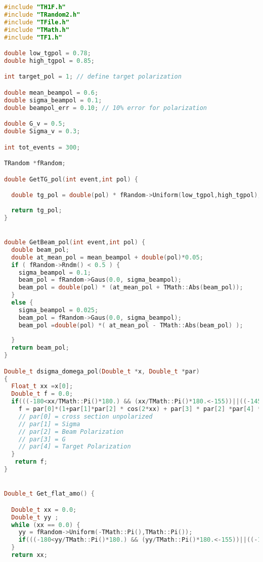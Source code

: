 \begin{lstlisting}[language=C++]
#include "TH1F.h"
#include "TRandom2.h"
#include "TFile.h"
#include "TMath.h"
#include "TF1.h"

double low_tgpol = 0.78;
double high_tgpol = 0.85;

int target_pol = 1; // define target polarization

double mean_beampol = 0.6;
double sigma_beampol = 0.1;
double beampol_err = 0.10; // 10% error for polarization

double G_v = 0.5;
double Sigma_v = 0.3;

int tot_events = 300;

TRandom *fRandom;

double GetTG_pol(int event,int pol) {

  double tg_pol = double(pol) * fRandom->Uniform(low_tgpol,high_tgpol);
  
  return tg_pol;
}


double GetBeam_pol(int event,int pol) {
  double beam_pol;
  double at_mean_pol = mean_beampol + double(pol)*0.05;
  if ( fRandom->Rndm() < 0.5 ) {
    sigma_beampol = 0.1;
    beam_pol = fRandom->Gaus(0.0, sigma_beampol);
    beam_pol = double(pol) * (at_mean_pol + TMath::Abs(beam_pol));
  }
  else {
    sigma_beampol = 0.025;
    beam_pol = fRandom->Gaus(0.0, sigma_beampol);
    beam_pol =double(pol) *( at_mean_pol - TMath::Abs(beam_pol) );
 
  }
  return beam_pol;
}

Double_t dsigma_domega_pol(Double_t *x, Double_t *par)
{
  Float_t xx =x[0];
  Double_t f = 0.0;
  if(((-180<xx/TMath::Pi()*180.) && (xx/TMath::Pi()*180.<-155))||((-145<xx/TMath::Pi()*180.)&&(xx/TMath::Pi()*180.<-95))||((-85<xx/TMath::Pi()*180.)&&(xx/TMath::Pi()*180.<-35))||((-25<xx/TMath::Pi()*180.)&&(xx/TMath::Pi()*180.<25))||((35<xx/TMath::Pi()*180.)&&(xx/TMath::Pi()*180.<85))||((95<xx/TMath::Pi()*180.)&&(xx/TMath::Pi()*180.<145))||((155<xx/TMath::Pi()*180.)&&(xx/TMath::Pi()*180.<180))){
    f = par[0]*(1+par[1]*par[2] * cos(2*xx) + par[3] * par[2] *par[4] * sin(2*xx));  
    // par[0] = cross section unpolarized
    // par[1] = Sigma
    // par[2] = Beam Polarization
    // par[3] = G
    // par[4] = Target Polarization
  }
   return f;
}


Double_t Get_flat_amo() {

  Double_t xx = 0.0;
  Double_t yy ;
  while (xx == 0.0) {
    yy = fRandom->Uniform(-TMath::Pi(),TMath::Pi());
    if(((-180<yy/TMath::Pi()*180.) && (yy/TMath::Pi()*180.<-155))||((-145<yy/TMath::Pi()*180.)&&(yy/TMath::Pi()*180.<-95))||((-85<yy/TMath::Pi()*180.)&&(yy/TMath::Pi()*180.<-35))||((-25<yy/TMath::Pi()*180.)&&(yy/TMath::Pi()*180.<25))||((35<yy/TMath::Pi()*180.)&&(yy/TMath::Pi()*180.<85))||((95<yy/TMath::Pi()*180.)&&(yy/TMath::Pi()*180.<145))||((155<yy/TMath::Pi()*180.)&&(yy/TMath::Pi()*180.<180))) xx = yy; 
  }
  return xx;


\end{lstlisting}
